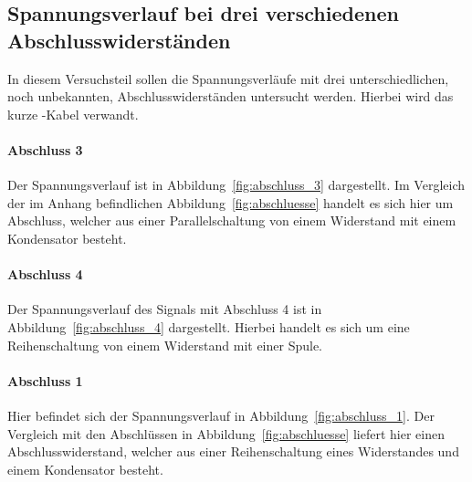 \subsection{Spannungsverlauf bei drei verschiedenen Abschlusswiderständen}
\label{sub:spannungsverlauf_bei_drei_verschiedenen_abschlusswiderst_nden}

In diesem Versuchsteil sollen die Spannungsverläufe mit drei unterschiedlichen,
noch unbekannten, Abschlusswiderständen untersucht werden.
Hierbei wird das kurze \CU-Kabel verwandt.

\paragraph{Abschluss 3}
\label{ssub:abschluss_3}

Der Spannungsverlauf ist in Abbildung~\ref{fig:abschluss_3} dargestellt.
Im Vergleich der im Anhang befindlichen Abbildung~\ref{fig:abschluesse} handelt
es sich hier um Abschluss, welcher aus einer Parallelschaltung von einem
Widerstand mit einem Kondensator besteht.

\paragraph{Abschluss 4}
\label{ssub:abschluss_4}

Der Spannungsverlauf des Signals mit Abschluss 4 ist in
Abbildung~\ref{fig:abschluss_4} dargestellt. Hierbei handelt es sich um eine
Reihenschaltung von einem Widerstand mit einer Spule.

\paragraph{Abschluss 1}
\label{par:abschluss_1}

Hier befindet sich der Spannungsverlauf in Abbildung~\ref{fig:abschluss_1}.
Der Vergleich mit den Abschlüssen in Abbildung~\ref{fig:abschluesse} liefert
hier einen Abschlusswiderstand, welcher aus einer Reihenschaltung eines
Widerstandes und einem Kondensator besteht.


